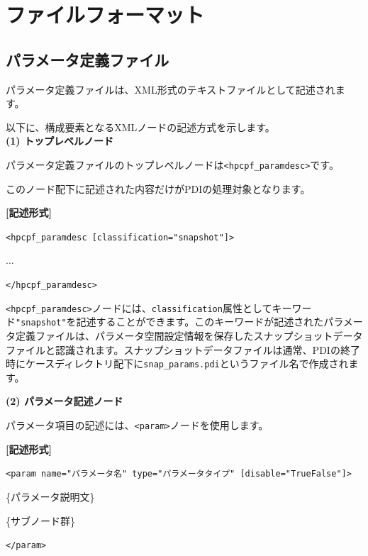 \documentclass[a4paper,11pt]{jarticle}
\begin{document}
{\newpage
\section{ファイルフォーマット}

\subsection{パラメータ定義ファイル}

パラメータ定義ファイルは、XML形式のテキストファイルとして記述されます。

以下に、構成要素となるXMLノードの記述方式を示します。\\

\textbf{(1) トップレベルノード}

パラメータ定義ファイルのトップレベルノードは\texttt{<hpcpf\_paramdesc>}です。

このノード配下に記述された内容だけがPDIの処理対象となります。

\vspace{8pt}
\leftskip=12pt
\textbf{[記述形式]}

\leftskip=42pt
\texttt{<hpcpf\_paramdesc  [classification="snapshot"]>} 
   
...

\texttt{</hpcpf\_paramdesc>}

\vspace{8pt}
\leftskip=0pt
\texttt{<hpcpf\_paramdesc>}ノードには、{\tt classification}属性としてキーワード\texttt{"snapshot"}を記述することができます。このキーワードが記述されたパラメータ定義ファイルは、パラメータ空間設定情報を保存したスナップショットデータファイルと認識されます。スナップショットデータファイルは通常、PDIの終了時にケースディレクトリ配下に{\tt snap\_params.pdi}というファイル名で作成されます。

\vspace{12pt}
\textbf{(2) パラメータ記述ノード}

パラメータ項目の記述には、\texttt{<param>}ノードを使用します。

\vspace{8pt}
\leftskip=12pt
\textbf{[記述形式]}

\leftskip=42pt
\texttt{<param name="パラメータ名"  type="パラメータタイプ" 
 [disable="True\textbar{}False"]>}    

\parindent=14pt
\{パラメータ説明文\}

\{サブノード群\}

\parindent=0pt
\texttt{</param>}

}
\end{document}
